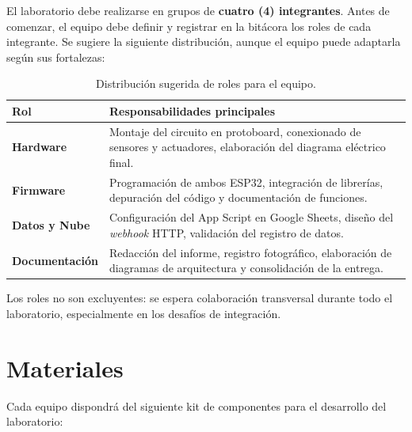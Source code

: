 \documentclass[12pt,leqno]{article}
\begin{document}
El laboratorio debe realizarse en grupos de \textbf{cuatro (4) integrantes}. Antes
de comenzar, el equipo debe definir y registrar en la bit\'acora los roles de cada
integrante. Se sugiere la siguiente distribuci\'on, aunque el equipo puede adaptarla
seg\'un sus fortalezas:

\begin{table}[!ht]
\centering
\begin{tabular}{|p{3.5cm}|p{9.5cm}|}
\hline
\textbf{Rol} & \textbf{Responsabilidades principales} \\
\hline
\textbf{Hardware} & Montaje del circuito en protoboard, conexionado de sensores y
actuadores, elaboraci\'on del diagrama el\'ectrico final. \\
\hline
\textbf{Firmware} & Programaci\'on de ambos ESP32, integraci\'on de librer\'ias,
depuraci\'on del c\'odigo y documentaci\'on de funciones. \\
\hline
\textbf{Datos y Nube} & Configuraci\'on del App Script en Google Sheets, dise\~no
del \textit{webhook} HTTP, validaci\'on del registro de datos. \\
\hline
\textbf{Documentaci\'on} & Redacci\'on del informe, registro fotogr\'afico,
elaboraci\'on de diagramas de arquitectura y consolidaci\'on de la entrega. \\
\hline
\end{tabular}
\caption{Distribuci\'on sugerida de roles para el equipo.}
\end{table}

\noindent Los roles no son excluyentes: se espera colaboraci\'on transversal durante
todo el laboratorio, especialmente en los desaf\'ios de integraci\'on.

\newpage
\section{Materiales}

Cada equipo dispondr\'a del siguiente kit de componentes para el desarrollo del
laboratorio:
\end{document}
